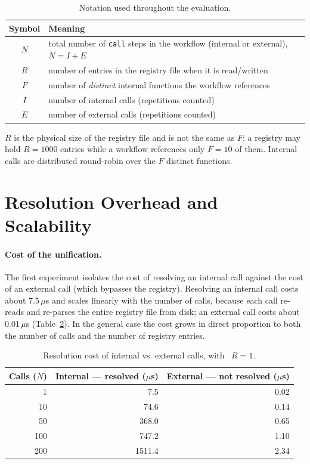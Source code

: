 \begin{table}[htbp]
  \centering
  \caption{Notation used throughout the evaluation.}
  \label{tab:eval-notation}
  \begin{tabular}{cl}
    \hline
    \textbf{Symbol} & \textbf{Meaning} \\
    \hline
    $N$ & total number of \texttt{call} steps in the workflow (internal or external), $N = I + E$ \\
    $R$ & number of entries in the registry file when it is read/written \\
    $F$ & number of \emph{distinct} internal functions the workflow references \\
    $I$ & number of internal calls (repetitions counted) \\
    $E$ & number of external calls (repetitions counted) \\
    \hline
  \end{tabular}
\end{table}

$R$ is the physical size of the registry file and is not the same as $F$: a registry may hold
$R{=}1000$ entries while a workflow references only $F{=}10$ of them. Internal calls are
distributed round-robin over the $F$ distinct functions.

\section{Resolution Overhead and Scalability}
\label{sec:eval-resolution}

\paragraph{Cost of the unification.}
The first experiment isolates the cost of resolving an internal call against the cost of an
external call (which bypasses the registry). Resolving an internal call costs about
$7.5\,\mu$s and scales linearly with the number of calls, because each call re-reads and re-parses
the entire registry file from disk; an external call costs about $0.01\,\mu$s
(Table~\ref{tab:eval-p3}). In the general case the cost grows in direct proportion to both the
number of calls and the number of registry entries.

\begin{table}[htbp]
  \centering
  \caption{Resolution cost of internal vs. external calls, with \ $R{=}1$.}
  \label{tab:eval-p3}
  \begin{tabular}{rrr}
    \hline
    \textbf{Calls ($N$)} & \textbf{Internal --- resolved ($\mu$s)} & \textbf{External --- not resolved ($\mu$s)} \\
    \hline
    1   & 7.5    & 0.02 \\
    10  & 74.6   & 0.14 \\
    50  & 368.0  & 0.65 \\
    100 & 747.2  & 1.10 \\
    200 & 1511.4 & 2.34 \\
    \hline
  \end{tabular}
\end{table}

